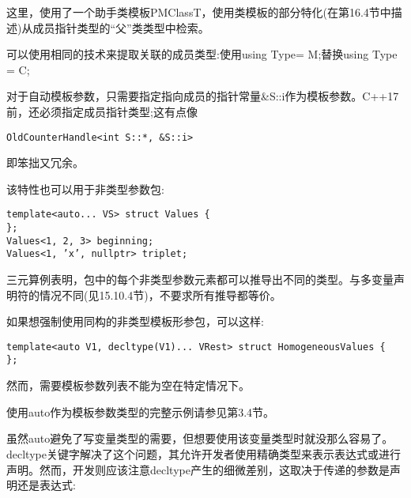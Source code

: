 这里，使用了一个助手类模板PMClassT，使用类模板的部分特化(在第16.4节中描述)从成员指针类型的“父”类类型中检索。

\begin{tcolorbox}[colback=webgreen!5!white,colframe=webgreen!75!black]
\hspace*{0.75cm}可以使用相同的技术来提取关联的成员类型:使用using Type= M;替换using Type = C;
\end{tcolorbox}

对于自动模板参数，只需要指定指向成员的指针常量\&S::i作为模板参数。C++17前，还必须指定成员指针类型;这有点像

\begin{lstlisting}[style=styleCXX]
OldCounterHandle<int S::*, &S::i>
\end{lstlisting}

即笨拙又冗余。

该特性也可以用于非类型参数包:

\begin{lstlisting}[style=styleCXX]
template<auto... VS> struct Values {
};
Values<1, 2, 3> beginning;
Values<1, ’x’, nullptr> triplet;
\end{lstlisting}

三元算例表明，包中的每个非类型参数元素都可以推导出不同的类型。与多变量声明符的情况不同(见15.10.4节)，不要求所有推导都等价。

如果想强制使用同构的非类型模板形参包，可以这样:

\begin{lstlisting}[style=styleCXX]
template<auto V1, decltype(V1)... VRest> struct HomogeneousValues {
};
\end{lstlisting}

然而，需要模板参数列表不能为空在特定情况下。

使用auto作为模板参数类型的完整示例请参见第3.4节。


虽然auto避免了写变量类型的需要，但想要使用该变量类型时就没那么容易了。decltype关键字解决了这个问题，其允许开发者使用精确类型来表示表达式或进行声明。然而，开发则应该注意decltype产生的细微差别，这取决于传递的参数是声明还是表达式:

